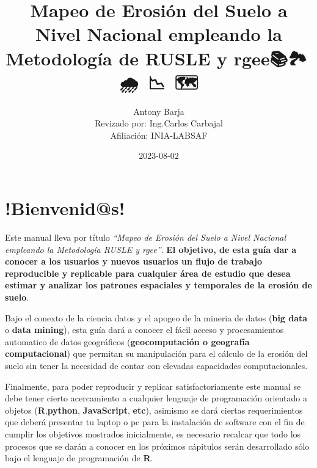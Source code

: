 \documentclass[
  letterpaper,
  DIV=11,
  numbers=noendperiod]{scrreprt}
\title{Mapeo de Erosión del Suelo a Nivel Nacional empleando la
Metodología de RUSLE y rgee📚🏞️🌱🌧️🚜🔎📉💨🌾🗺️}
\author{ Antony Barja\\
Revizado por: Ing.Carlos Carbajal\\
Afiliación: INIA-LABSAF}
\date{2023-08-02}
\renewcommand*\contentsname{Tabla de contenidos}
\newcommand\contentsname{Tabla de contenidos}
\begin{document}
\maketitle
\ifdefined\Shaded\renewenvironment{Shaded}{\begin{tcolorbox}[enhanced, sharp corners, interior hidden, borderline west={3pt}{0pt}{shadecolor}, boxrule=0pt, frame hidden, breakable]}{\end{tcolorbox}}\fi

\renewcommand*\contentsname{Tabla de contenidos}
{
\hypersetup{linkcolor=}
\setcounter{tocdepth}{2}
\tableofcontents
}

\hypertarget{bienvenids}{%
\chapter*{!Bienvenid@s! 👋}\label{bienvenids}}


Este manual lleva por título \emph{``Mapeo de Erosión del Suelo a Nivel
Nacional empleando la Metodología RUSLE y rgee''}. \textbf{El objetivo,
de esta guía dar a conocer a los usuarios y nuevos usuarios un flujo de
trabajo reproducible y replicable para cualquier área de estudio que
desea estimar y analizar los patrones espaciales y temporales de la
erosión de suelo}.

Bajo el conexto de la ciencia datos y el apogeo de la mineria de datos
(\textbf{big data} o \textbf{data mining}), esta guía dará a conocer el
fácil acceso y procesamientos automatico de datos geográficos
(\textbf{geocomputación o geografía computacional}) que permitan su
manipulación para el cálculo de la erosión del suelo sin tener la
necesidad de contar con elevadas capacidades computacionales.

Finalmente, para poder reproducir y replicar satisfactoriamente este
manual se debe tener cierto acercamiento a cualquier lenguaje de
programación orientado a objetos (\textbf{R},\textbf{python},
\textbf{JavaScript}, \textbf{etc}), asimismo se dará ciertas
requerimientos que deberá presentar tu laptop o pc para la instalación
de software con el fin de cumplir los objetivos mostrados inicialmente,
es necesario recalcar que todo los procesos que se darán a conocer en
los próximos cápitulos serán desarrollado sólo bajo el lenguaje de
programación de \textbf{R}.

\end{document}
